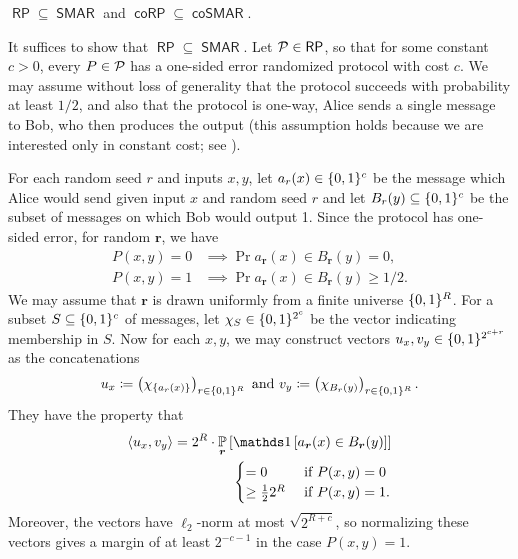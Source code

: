\documentclass[conference]{IEEEtran}
\newcommand{\cplxclass}[1]{\mathsf{#1}}
\DeclareMathOperator{\RP}{\cplxclass{RP}}
\DeclareMathOperator{\coRP}{\cplxclass{coRP}}
\DeclareMathOperator{\SMAR}{\cplxclass{SMAR}}
\DeclareMathOperator{\coSMAR}{\cplxclass{coSMAR}}
\begin{document}
\begin{proposition} \label{prop:rp-in-smar}
    $\RP \subseteq \SMAR$ and $\coRP \subseteq \coSMAR$.
\end{proposition}
\begin{IEEEproof}
It suffices to show that $\RP \subseteq \SMAR$. Let $\cP \in \RP$, so that for some
constant $c > 0$, every $P \in \mathcal{P}$ has a one-sided error randomized protocol
with cost $c$. We may assume without loss of generality that the protocol
succeeds with probability at least $1/2$, and also that the protocol is one-way, \ie Alice
sends a single message to Bob, who then produces the output (this assumption
holds because we are interested only in constant cost; see \eg \cite{HWZ22}).

For each random seed $r$ and inputs $x,y$, let $a_r(x) \in \{0,1\}^c$ be the message
which Alice would send given input $x$ and random seed $r$ and let $B_r(y)
\subseteq \{0,1\}^c$ be the subset of messages on which Bob would output 1. Since
the protocol has one-sided error, for random $\bm r$, we have
\begin{align*}
    P(x,y) = 0 &\implies \Pr{ a_{\bm r}(x) \in B_{\bm r}(y) } = 0, \\
    P(x,y) = 1 &\implies \Pr{ a_{\bm r}(x) \in B_{\bm r}(y) } \geq 1/2  .
\end{align*}
We may assume that $\bm r$ is drawn uniformly from a finite universe $\{0,1\}^R$.
For a subset $S \subseteq \{0,1\}^c$ of messages, let $\chi_S \in \{0,1\}^{2^c}$
be the vector indicating membership in $S$.
Now for each $x,y$, we may construct vectors $u_x, v_y \in \{0,1\}^{2^{c+r}}$ as the
concatenations
\begin{align*}
    u_x \coloneqq \left( \chi_{\{a_r(x)\}} \right)_{r \in \{0,1\}^R}  
    \text{ and }
    v_y \coloneqq \left( \chi_{B_r(y)} \right)_{r \in \{0,1\}^R}.
\end{align*}
They have the property that
\begin{align*}
    \inn{u_x, v_y}
    = 2^R \cdot \Pru{\bm r}{ \ind{ a_{\bm r}(x) \in B_{\bm r}(y) } }\\
    \begin{cases}
        = 0 &\text{ if } P(x,y) = 0 \\
        \geq \tfrac{1}{2} 2^R &\text{ if } P(x,y) = 1 .
    \end{cases}
\end{align*}
Moreover, the vectors have $\ell_2$-norm at most $\sqrt{2^{R+c}}$, so normalizing these
vectors gives a margin of at least $2^{-c-1}$ in the case $P(x,y) = 1$.
\end{IEEEproof}
\end{document}
